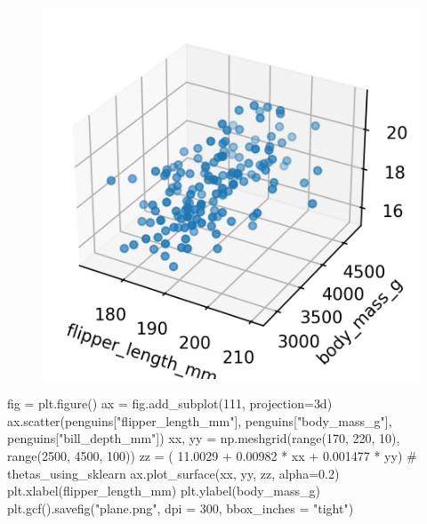 \documentclass[
  letterpaper,
  DIV=11,
  numbers=noendperiod]{scrreprt}
\newenvironment{Shaded}{\begin{snugshade}}{\end{snugshade}}
\newcommand{\BuiltInTok}[1]{\textcolor[rgb]{0.00,0.23,0.31}{#1}}
\newcommand{\CommentTok}[1]{\textcolor[rgb]{0.37,0.37,0.37}{#1}}
\newcommand{\DecValTok}[1]{\textcolor[rgb]{0.68,0.00,0.00}{#1}}
\newcommand{\FloatTok}[1]{\textcolor[rgb]{0.68,0.00,0.00}{#1}}
\newcommand{\NormalTok}[1]{\textcolor[rgb]{0.00,0.23,0.31}{#1}}
\newcommand{\OperatorTok}[1]{\textcolor[rgb]{0.37,0.37,0.37}{#1}}
\newcommand{\StringTok}[1]{\textcolor[rgb]{0.13,0.47,0.30}{#1}}
\begin{document}
\begin{figure}[H]

{\centering \includegraphics{gradient_descent/gradient_descent_files/figure-pdf/cell-19-output-2.png}

}

\end{figure}

\begin{Shaded}
\begin{Highlighting}[]
\NormalTok{fig }\OperatorTok{=}\NormalTok{ plt.figure()}
\NormalTok{ax }\OperatorTok{=}\NormalTok{ fig.add\_subplot(}\DecValTok{111}\NormalTok{, projection}\OperatorTok{=}\StringTok{\textquotesingle{}3d\textquotesingle{}}\NormalTok{)}
\NormalTok{ax.scatter(penguins[}\StringTok{"flipper\_length\_mm"}\NormalTok{], penguins[}\StringTok{"body\_mass\_g"}\NormalTok{], penguins[}\StringTok{"bill\_depth\_mm"}\NormalTok{])}
\NormalTok{xx, yy }\OperatorTok{=}\NormalTok{ np.meshgrid(}\BuiltInTok{range}\NormalTok{(}\DecValTok{170}\NormalTok{, }\DecValTok{220}\NormalTok{, }\DecValTok{10}\NormalTok{), }\BuiltInTok{range}\NormalTok{(}\DecValTok{2500}\NormalTok{, }\DecValTok{4500}\NormalTok{, }\DecValTok{100}\NormalTok{))}
\NormalTok{zz }\OperatorTok{=}\NormalTok{ ( }\FloatTok{11.0029} \OperatorTok{+} \FloatTok{0.00982} \OperatorTok{*}\NormalTok{ xx }\OperatorTok{+} \FloatTok{0.001477} \OperatorTok{*}\NormalTok{ yy) }\CommentTok{\# thetas\_using\_sklearn}
\NormalTok{ax.plot\_surface(xx, yy, zz, alpha}\OperatorTok{=}\FloatTok{0.2}\NormalTok{)}
\NormalTok{plt.xlabel(}\StringTok{\textquotesingle{}flipper\_length\_mm\textquotesingle{}}\NormalTok{)}
\NormalTok{plt.ylabel(}\StringTok{\textquotesingle{}body\_mass\_g\textquotesingle{}}\NormalTok{)}
\NormalTok{plt.gcf().savefig(}\StringTok{"plane.png"}\NormalTok{, dpi }\OperatorTok{=} \DecValTok{300}\NormalTok{, bbox\_inches }\OperatorTok{=} \StringTok{"tight"}\NormalTok{)}
\end{Highlighting}
\end{Shaded}
\end{document}
